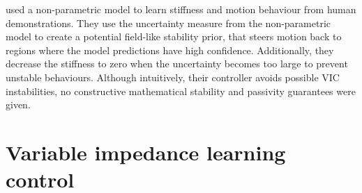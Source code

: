 \cite{franzeseILoSAInteractiveLearning2021} used a non-parametric model to learn stiffness and motion behaviour from human demonstrations. They use the uncertainty measure from the non-parametric model to create a potential field-like stability prior, that steers motion back to regions where the model predictions have high confidence. Additionally, they decrease the stiffness to zero when the uncertainty becomes too large to prevent unstable behaviours. Although intuitively, their controller avoids possible VIC instabilities, no constructive mathematical stability and passivity guarantees were given.

\section{Variable impedance learning control}


